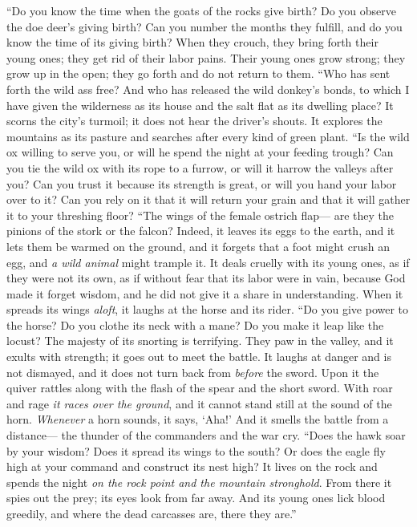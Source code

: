 \begin{biblechapter} %
\verse “Do you know the time when the goats of the rocks give birth? 
Do you observe the doe deer’s giving birth?
\verse Can you number the months they fulfill, 
and do you know the time of its giving birth?
\verse When they crouch, they bring forth their young ones; 
they get rid of their labor pains.
\verse Their young ones grow strong; they grow up in the open; 
they go forth and do not return to them.
\verse “Who has sent forth the wild ass free? 
And who has released the wild donkey’s bonds,
\verse to which I have given the wilderness as its house 
and the salt flat as its dwelling place?
\verse It scorns the city’s turmoil; 
it does not hear the driver’s shouts.
\verse It explores the mountains as its pasture 
and searches after every kind of green plant.
\verse “Is the wild ox willing to serve you, 
or will he spend the night at your feeding trough?
\verse Can you tie the wild ox with its rope to a furrow, 
or will it harrow the valleys after you?
\verse Can you trust it because its strength is great, 
or will you hand your labor over to it?
\verse Can you rely on it that it will return your grain 
and that it will gather it to your threshing floor?
\verse “The wings of the female ostrich flap— 
are they the pinions of the stork or the falcon?
\verse Indeed, it leaves its eggs to the earth, 
and it lets them be warmed on the ground,
\verse and it forgets that a foot might crush an egg, 
and \textit{a wild animal} might trample it.
\verse It deals cruelly with its young ones, as if they were not its own, 
as if without fear that its labor were in vain,
\verse because God made it forget wisdom, 
and he did not give it a share in understanding.
\verse When it spreads its wings \textit{aloft}, 
it laughs at the horse and its rider.
\verse “Do you give power to the horse? 
Do you clothe its neck with a mane?
\verse Do you make it leap like the locust? 
The majesty of its snorting is terrifying.
\verse They paw in the valley, and it exults with strength; 
it goes out to meet the battle.
\verse It laughs at danger and is not dismayed, 
and it does not turn back from \textit{before} the sword.
\verse Upon it the quiver rattles 
along with the flash of the spear and the short sword.
\verse With roar and rage \textit{it races over the ground}, 
and it cannot stand still at the sound of the horn.
\verse \textit{Whenever} a horn sounds, it says, ‘Aha!’ 
And it smells the battle from a distance— 
the thunder of the commanders and the war cry.
\verse “Does the hawk soar by your wisdom? 
Does it spread its wings to the south?
\verse Or does the eagle fly high at your command 
and construct its nest high?
\verse It lives on the rock and spends the night 
\textit{on the rock point and the mountain stronghold}.
\verse From there it spies out the prey; 
its eyes look from far away.
\verse And its young ones lick blood greedily, 
and where the dead carcasses are, there they are.”
\end{biblechapter}

